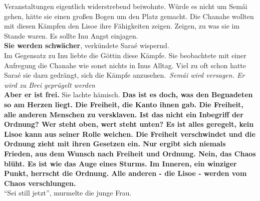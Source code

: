 Veranstaltungen eigentlich widerstrebend beiwohnte. Würde es nicht um Semái gehen, hätte sie einen 
großen Bogen um den Platz gemacht. Die Chanahe wollten mit diesen Kämpfen den Lisoe ihre 
Fähigkeiten zeigen. Zeigen, zu was sie im Stande waren. Es sollte Inu Angst einjagen. \\
\textbf{Sie werden schwächer}, verkündete Saraé wispernd.\\
Im Gegensatz zu Inu liebte die Göttin diese Kämpfe. Sie beobachtete mit einer Aufregung die Chanahe 
wie sonst nichts in Inus Alltag. Viel zu oft schon hatte Saraé sie dazu gedrängt, sich die Kämpfe 
anzusehen.\
\textit{Semái wird versagen. Er wird zu Brei geprügelt werden}\\
\textbf{Aber er ist frei.} Sie lachte hämisch. \textbf{Das ist es doch, was den Begnadeten so am 
Herzen liegt. Die Freiheit, die Kanto ihnen gab. Die Freiheit, alle anderen Menschen zu 
versklaven. Ist das nicht ein Inbegriff der Ordnung? Wer steht oben, wert steht unten? Es ist 
alles geregelt, kein Lisoe kann aus seiner Rolle weichen. Die Freiheit verschwindet und die 
Ordnung zieht mit ihren Gesetzen ein. Nur ergibt sich niemals Frieden, aus dem Wunsch nach 
Freiheit und Ordnung. Nein, das Chaos blüht. Es ist wie das Auge eines Sturms. Im Inneren, ein 
winziger Punkt, herrscht die Ordnung. Alle anderen - die Lisoe - werden vom Chaos verschlungen.}\\
``Sei still jetzt'', murmelte die junge Frau. \\

